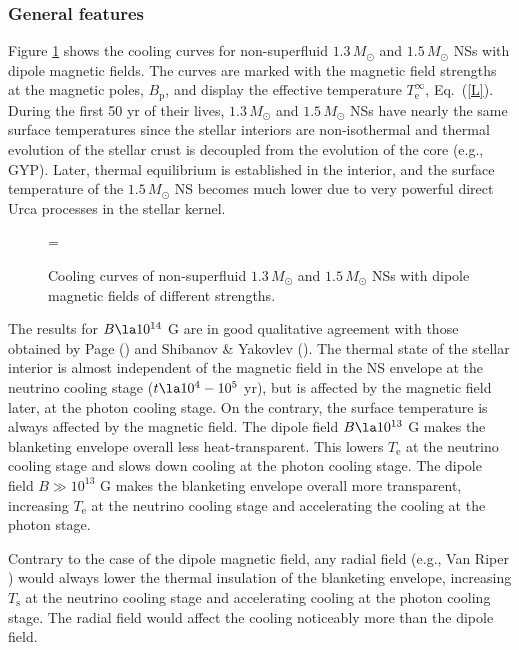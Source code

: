 \documentclass{aa}
\begin{document}
\subsubsection{General features}
%
Figure \ref{fig-c1} shows the cooling curves
for non-superfluid $1.3\, M_\odot$ and $1.5\, M_\odot$ NSs
with dipole magnetic fields. The curves
are marked with the magnetic field strengths at the magnetic poles,
$B_\mathrm{p}$, and display the effective
temperature $T_\mathrm{e}^\infty$, Eq.\ (\ref{L}).
During the first 50 yr of their lives, $1.3 \, M_\odot$
and $1.5 \, M_\odot$ NSs have nearly the same surface
temperatures since the stellar interiors
are non-isothermal and thermal evolution of the stellar
crust is decoupled from the evolution of the core
(e.g., GYP). Later, 
thermal equilibrium is established in the interior,
and the surface temperature of the $1.5\, M_\odot$ NS becomes much lower
due to very powerful direct Urca processes in the stellar kernel.

\begin{figure}
\centering
\epsfxsize=\hsize
{}
\caption{Cooling curves of non-superfluid
$1.3 \, M_\odot$ and $1.5 \, M_\odot$ NSs
with dipole magnetic fields
of different strengths.
}
\label{fig-c1}
\end{figure}

The results for $B \la 10^{14}$ G are in good
qualitative agreement with those obtained
by Page (\cite{page95}) and Shibanov \& Yakovlev (\cite{shibyak}).
The thermal state of the stellar interior
is almost independent of the magnetic field in the
NS envelope at the neutrino cooling stage
($t \la 10^4-10^5$ yr), but is affected by
the magnetic field later, at the photon cooling stage.
On the contrary, the surface temperature
is always affected by the magnetic field.
The dipole field $B \la 10^{13}$ G makes
the blanketing envelope overall less heat-transparent.
This lowers $T_\mathrm{e}$ at the neutrino cooling
stage  and slows down cooling at the photon cooling stage.
The dipole field $B \gg 10^{13}$ G makes the
blanketing envelope overall more transparent,
increasing $T_\mathrm{e}$ at the neutrino cooling stage
and accelerating the cooling at the photon stage.

Contrary to the case of the dipole magnetic field,
any radial field (e.g., Van Riper \cite{kvr91})
would always lower the thermal insulation
of the blanketing envelope, increasing $T_\mathrm{s}$
at the neutrino cooling stage and accelerating cooling
at the photon cooling stage. The radial field would affect
the cooling noticeably more than the
dipole field.
\end{document}
